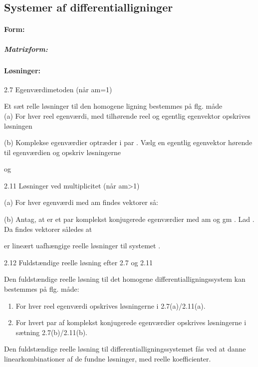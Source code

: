 \documentclass[
]{article}
\providecommand{\tightlist}{%
  \setlength{\itemsep}{0pt}\setlength{\parskip}{0pt}}
\begin{document}
\subsection{Systemer af
differentialligninger}\label{systemer-af-differentialligninger}

\paragraph{Form:}\label{form-1}

\subparagraph{Matrixform:}\label{matrixform}

\paragraph{Løsninger:}\label{luxf8sninger-1}

2.7 Egenværdimetoden (når am=1)

Et sæt relle løsninger til den homogene ligning {} bestemmes på flg.
måde\\
(a) For hver reel egenværdi, med tilhørende reel og egentlig egenvektor
{} opskrives løsningen

(b) Komplekse egenværdier optræder i par {}. Vælg en egentlig egenvektor
{} hørende til egenværdien {} og opskriv løsningerne

og

2.11 Løsninger ved multiplicitet {} (når am\textgreater1)

(a) For hver egenværdi {} med am {} findes vektorer {} så:

{}{}

(b) Antag, at {} er et par komplekst konjugerede egenværdier med am {}
og gm {}. Lad {}. Da findes vektorer {} således at

er lineært uafhængige reelle løsninger til systemet {}.

2.12 Fuldstændige reelle løsning efter 2.7 og 2.11

Den fuldstændige reelle løsning til det homogene
differentialligningssystem {} kan bestemmes på flg. måde:

\begin{enumerate}
\tightlist
\item
  For hver reel egenværdi {} opskrives løsningerne i 2.7(a)/2.11(a).
\item
  For hvert par {} af komplekst konjugerede egenværdier opskrives
  løsningerne i sætning 2.7(b)/2.11(b).
\end{enumerate}

Den fuldstændige reelle løsning til differentialligningssystemet fås ved
at danne linearkombinationer af de fundne {} løsninger, med reelle
koefficienter.
\end{document}
